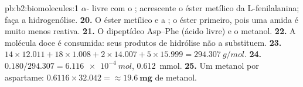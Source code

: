 \begin{solution}{pb:b2:biomolecules:1}
$\alpha$- livre com o ; acrescente o éster metílico da L-fenilalanina;
faça a hidrogenólise.
\textbf{20.} O éster metílico e a ; o éster primeiro, pois uma amida é muito menos reativa.
\textbf{21.} O dipeptídeo Asp--Phe (ácido livre) e o metanol.
\textbf{22.} A molécula doce é consumida: seus produtos de hidrólise não a substituem.
\textbf{23.} $14 \times 12.011 + 18 \times 1.008 + 2 \times 14.007 + 5 \times 15.999 =
\qty{294.307}{g/mol}$.
\textbf{24.} $0.180/294.307 = \qty{6.116e-4}{mol}$, \qty{0.612}{mmol}.
\textbf{25.} Um metanol por aspartame: $0.6116 \times 32.042 = \boldsymbol{\approx \qty{19.6}{mg}}$ de
metanol.
\end{solution}

